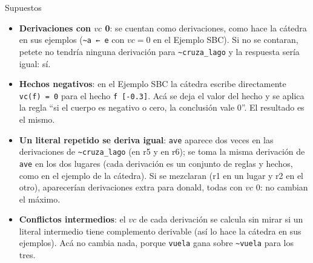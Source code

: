 \documentclass[11pt,a4paper]{article}
\newcommand{\nf}{\textasciitilde}
\begin{document}
\begin{aviso}{Supuestos}
\begin{itemize}
  \item \textbf{Derivaciones con $vc$ 0}: se cuentan como derivaciones, como hace la cátedra en sus ejemplos (\texttt{\nf a ← e} con $vc = 0$ en el Ejemplo SBC). Si no se contaran, petete no tendría ninguna derivación para \texttt{\nf cruza\_lago} y la respuesta sería igual: sí.
  \item \textbf{Hechos negativos}: en el Ejemplo SBC la cátedra escribe directamente \texttt{vc(f) = 0} para el hecho \texttt{f [-0.3]}. Acá se deja el valor del hecho y se aplica la regla ``si el cuerpo es negativo o cero, la conclusión vale 0''. El resultado es el mismo.\footnotemark{}
  \item \textbf{Un literal repetido se deriva igual}: \texttt{ave} aparece dos veces en las derivaciones de \texttt{\nf cruza\_lago} (en r5 y en r6); se toma la misma derivación de \texttt{ave} en los dos lugares (cada derivación es un conjunto de reglas y hechos, como en el ejemplo de la cátedra). Si se mezclaran (r1 en un lugar y r2 en el otro), aparecerían derivaciones extra para donald, todas con $vc$ 0: no cambian el máximo.
  \item \textbf{Conflictos intermedios}: el $vc$ de cada derivación se calcula sin mirar si un literal intermedio tiene complemento derivable (así lo hace la cátedra en sus ejemplos). Acá no cambia nada, porque \texttt{vuela} gana sobre \texttt{\nf vuela} para los tres.
\end{itemize}
\end{aviso}
\end{document}
